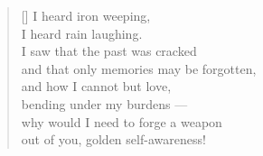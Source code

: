 \documentclass[a4paper,12pt,twoside,final]{book}
\begin{document}
\newpage


\settowidth{\versewidth}{and that only a memory can be forgotten;}

\begin{verse}[\versewidth]
  I heard iron weeping, \\
  I heard rain laughing. \\
  I saw that the past was cracked \\
  and that only memories may be forgotten, \\
  and how I cannot but love, \\
  bending under my burdens --- \\
  why would I need to forge a weapon \\
  out of you, golden self-awareness!
\end{verse}


\newpage

\settowidth{\versewidth}{}
\end{document}
